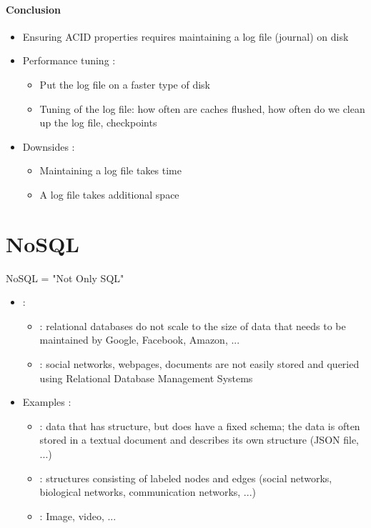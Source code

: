 \subsubsection{Conclusion}

\begin{itemize}
    \item Ensuring ACID properties requires maintaining a log file (journal) on disk
    \item Performance tuning :
    \begin{itemize}
        \item Put the log file on a faster type of disk
        \item Tuning of the log file: how often are caches flushed, how often do we clean up the log file, checkpoints
    \end{itemize}
    \item Downsides :
    \begin{itemize}
        \item Maintaining a log file takes time
        \item A log file takes additional space
    \end{itemize}
\end{itemize}

\chapter{NoSQL}

NoSQL = "Not Only SQL"


\begin{itemize}
    \item {} :
    \begin{itemize}
        \item {} : relational databases do not scale to the size of data that needs to be maintained by Google, Facebook, Amazon, ...
        \item {} : social networks, webpages, documents are not easily stored and queried using Relational Database Management Systems
    \end{itemize}        
    \item Examples :
    \begin{itemize}
        \item {} : data that has structure, but does have a fixed schema; the data is often stored in a textual document and describes its own structure (JSON file, ...)
        \item {} : structures consisting of labeled nodes and edges (social networks, biological networks, communication networks, ...)
        \item {} : Image, video, ...
    \end{itemize}
\end{itemize}

